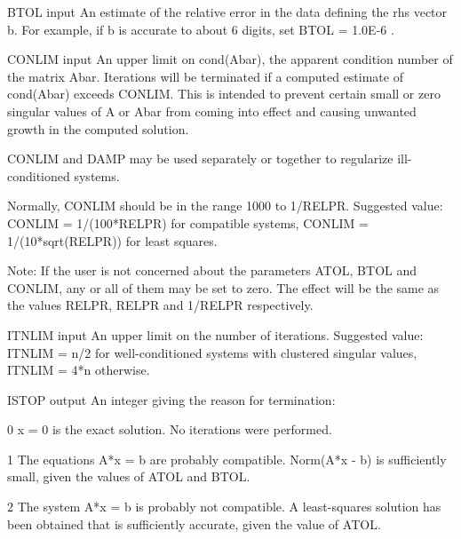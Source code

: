 \documentclass[11pt,twoside,nolof]{starlink}
\begin{document}
\begin{terminalv}
     BTOL    input      An estimate of the relative error in the data
                        defining the rhs vector b.  For example,
                        if b is accurate to about 6 digits, set
                        BTOL = 1.0E-6 .

     CONLIM  input      An upper limit on cond(Abar), the apparent
                        condition number of the matrix Abar.
                        Iterations will be terminated if a computed
                        estimate of cond(Abar) exceeds CONLIM.
                        This is intended to prevent certain small or
                        zero singular values of A or Abar from
                        coming into effect and causing unwanted growth
                        in the computed solution.

                        CONLIM and DAMP may be used separately or
                        together to regularize ill-conditioned systems.

                        Normally, CONLIM should be in the range
                        1000 to 1/RELPR.
                        Suggested value:
                        CONLIM = 1/(100*RELPR)  for compatible systems,
                        CONLIM = 1/(10*sqrt(RELPR)) for least squares.

             Note:  If the user is not concerned about the parameters
             ATOL, BTOL and CONLIM, any or all of them may be set
             to zero.  The effect will be the same as the values
             RELPR, RELPR and 1/RELPR respectively.

     ITNLIM  input      An upper limit on the number of iterations.
                        Suggested value:
                        ITNLIM = n/2   for well-conditioned systems
                                       with clustered singular values,
                        ITNLIM = 4*n   otherwise.

     ISTOP   output     An integer giving the reason for termination:

                0       x = 0  is the exact solution.
                        No iterations were performed.

                1       The equations A*x = b are probably
                        compatible.  Norm(A*x - b) is sufficiently
                        small, given the values of ATOL and BTOL.

                2       The system A*x = b is probably not
                        compatible.  A least-squares solution has
                        been obtained that is sufficiently accurate,
                        given the value of ATOL.


\end{terminalv}
\end{document}
